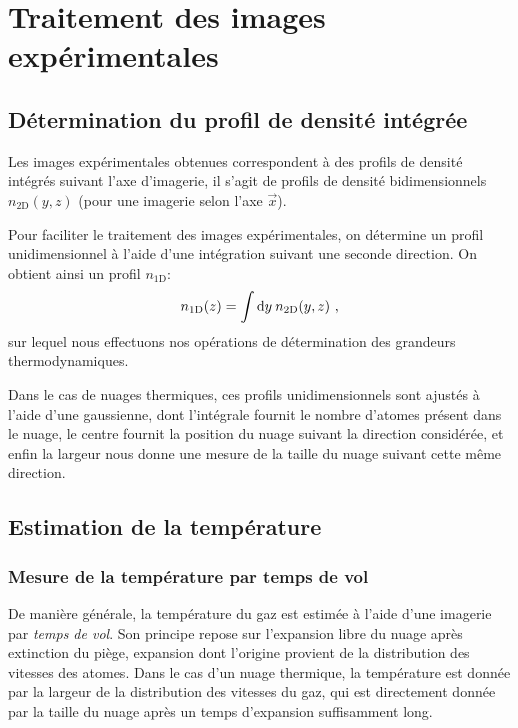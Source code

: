 \chapter{Traitement des images expérimentales}
\label{ch:anex_mesure_temp}

\section{Détermination du profil de densité intégrée}

Les images expérimentales obtenues correspondent à des profils de densité intégrés suivant l'axe d'imagerie, il s'agit de profils de densité bidimensionnels $n_{\mathrm{2D}}(y,z)$ (pour une imagerie selon l'axe $\vec{x}$).

Pour faciliter le traitement des images expérimentales, on détermine un profil unidimensionnel à l'aide d'une intégration suivant une seconde direction. On obtient ainsi un profil $n_{\mathrm{1D}}$: 
\begin{equation}
n_{\mathrm{1D}}(z)=\int{\mathop{}\mathopen{}\mathrm{d}y \: n_{\mathrm{2D}}(y,z)} \text{ ,}
\end{equation}
sur lequel nous effectuons nos opérations de détermination des grandeurs thermodynamiques.

Dans le cas de nuages thermiques, ces profils unidimensionnels sont ajustés à l'aide d'une gaussienne, dont l'intégrale fournit le nombre d'atomes présent dans le nuage, le centre fournit la position du nuage suivant la direction considérée, et enfin la largeur nous donne une mesure de la taille du nuage suivant cette même direction.















\section{Estimation de la température}
\subsection{Mesure de la température par temps de vol}
De manière générale, la température du gaz est estimée à l'aide d'une imagerie par \emph{temps de vol}. Son principe repose sur l'expansion libre du nuage après extinction du piège, expansion dont l'origine provient de la distribution des vitesses des atomes. Dans le cas d'un nuage thermique, la température est donnée par la largeur de la distribution des vitesses du gaz, qui est directement donnée par la taille du nuage après un temps d'expansion suffisamment long.

